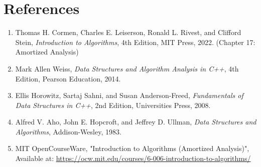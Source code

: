 \documentclass[12pt,a4paper]{article}
\begin{document}
\section*{References}

\begin{enumerate}
    \item Thomas H. Cormen, Charles E. Leiserson, Ronald L. Rivest, and Clifford Stein, \textit{Introduction to Algorithms}, 4th Edition, MIT Press, 2022. (Chapter 17: Amortized Analysis)

    \item Mark Allen Weiss, \textit{Data Structures and Algorithm Analysis in C++}, 4th Edition, Pearson Education, 2014.

    \item Ellis Horowitz, Sartaj Sahni, and Susan Anderson-Freed, \textit{Fundamentals of Data Structures in C++}, 2nd Edition, Universities Press, 2008.

    \item Alfred V. Aho, John E. Hopcroft, and Jeffrey D. Ullman, \textit{Data Structures and Algorithms}, Addison-Wesley, 1983.

    \item MIT OpenCourseWare, "Introduction to Algorithms (Amortized Analysis)", Available at:
    \url{https://ocw.mit.edu/courses/6-006-introduction-to-algorithms/}

\end{enumerate}
\end{document}
